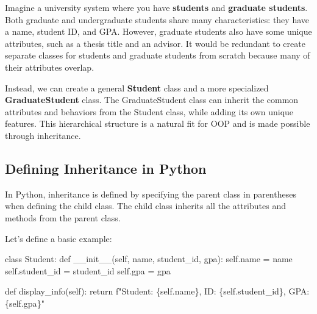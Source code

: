 \documentclass[
  letterpaper,
  DIV=11,
  numbers=noendperiod]{scrreprt}
\newenvironment{Shaded}{\begin{snugshade}}{\end{snugshade}}
\newcommand{\ControlFlowTok}[1]{\textcolor[rgb]{0.00,0.23,0.31}{#1}}
\newcommand{\FunctionTok}[1]{\textcolor[rgb]{0.28,0.35,0.67}{#1}}
\newcommand{\KeywordTok}[1]{\textcolor[rgb]{0.00,0.23,0.31}{#1}}
\newcommand{\NormalTok}[1]{\textcolor[rgb]{0.00,0.23,0.31}{#1}}
\newcommand{\OperatorTok}[1]{\textcolor[rgb]{0.37,0.37,0.37}{#1}}
\newcommand{\SpecialCharTok}[1]{\textcolor[rgb]{0.37,0.37,0.37}{#1}}
\newcommand{\SpecialStringTok}[1]{\textcolor[rgb]{0.13,0.47,0.30}{#1}}
\newcommand{\VariableTok}[1]{\textcolor[rgb]{0.07,0.07,0.07}{#1}}
\begin{document}
Imagine a university system where you have \textbf{students} and
\textbf{graduate students}. Both graduate and undergraduate students
share many characteristics: they have a name, student ID, and GPA.
However, graduate students also have some unique attributes, such as a
thesis title and an advisor. It would be redundant to create separate
classes for students and graduate students from scratch because many of
their attributes overlap.

Instead, we can create a general \textbf{Student} class and a more
specialized \textbf{GraduateStudent} class. The GraduateStudent class
can inherit the common attributes and behaviors from the Student class,
while adding its own unique features. This hierarchical structure is a
natural fit for OOP and is made possible through inheritance.

\hypertarget{defining-inheritance-in-python}{%
\subsection{Defining Inheritance in
Python}\label{defining-inheritance-in-python}}

In Python, inheritance is defined by specifying the parent class in
parentheses when defining the child class. The child class inherits all
the attributes and methods from the parent class.

Let's define a basic example:

\begin{Shaded}
\begin{Highlighting}[]
\KeywordTok{class}\NormalTok{ Student:}
    \KeywordTok{def} \FunctionTok{\_\_init\_\_}\NormalTok{(}\VariableTok{self}\NormalTok{, name, student\_id, gpa):}
        \VariableTok{self}\NormalTok{.name }\OperatorTok{=}\NormalTok{ name}
        \VariableTok{self}\NormalTok{.student\_id }\OperatorTok{=}\NormalTok{ student\_id}
        \VariableTok{self}\NormalTok{.gpa }\OperatorTok{=}\NormalTok{ gpa}

    \KeywordTok{def}\NormalTok{ display\_info(}\VariableTok{self}\NormalTok{):}
        \ControlFlowTok{return} \SpecialStringTok{f"Student: }\SpecialCharTok{\{}\VariableTok{self}\SpecialCharTok{.}\NormalTok{name}\SpecialCharTok{\}}\SpecialStringTok{, ID: }\SpecialCharTok{\{}\VariableTok{self}\SpecialCharTok{.}\NormalTok{student\_id}\SpecialCharTok{\}}\SpecialStringTok{, GPA: }\SpecialCharTok{\{}\VariableTok{self}\SpecialCharTok{.}\NormalTok{gpa}\SpecialCharTok{\}}\SpecialStringTok{"}
\end{Highlighting}
\end{Shaded}
\end{document}

